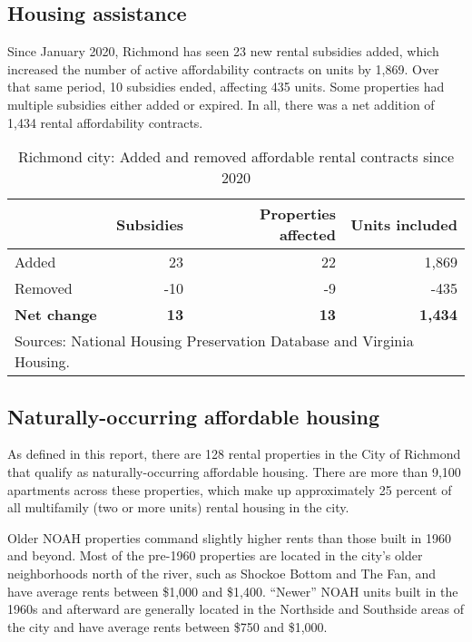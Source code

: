 \documentclass[
  letterpaper,
  DIV=11,
  numbers=noendperiod]{scrreprt}
\begin{document}
\hypertarget{housing-assistance}{%
\subsection{Housing assistance}\label{housing-assistance}}

Since January 2020, Richmond has seen 23 new rental subsidies added,
which increased the number of active affordability contracts on units by
1,869. Over that same period, 10 subsidies ended, affecting 435 units.
Some properties had multiple subsidies either added or expired. In all,
there was a net addition of 1,434 rental affordability contracts.

\hypertarget{tbl-nhpd}{}
\begin{table}
\caption{\label{tbl-nhpd}Richmond city: Added and removed affordable rental contracts since 2020 }\tabularnewline

\centering
\begin{tabular}{l|r|r|r}
\hline
 & Subsidies & Properties affected & Units included\\
\hline
Added & 23 & 22 & 1,869\\
\hline
Removed & -10 & -9 & -435\\
\hline
\textbf{Net change} & \textbf{13} & \textbf{13} & \textbf{1,434}\\
\hline
\multicolumn{4}{l}{\rule{0pt}{1em}Sources: National Housing Preservation Database and Virginia Housing.}\\
\end{tabular}
\end{table}

\hypertarget{naturally-occurring-affordable-housing-1}{%
\subsection{Naturally-occurring affordable
housing}\label{naturally-occurring-affordable-housing-1}}

As defined in this report, there are 128 rental properties in the City
of Richmond that qualify as naturally-occurring affordable housing.
There are more than 9,100 apartments across these properties, which make
up approximately 25 percent of all multifamily (two or more units)
rental housing in the city.

Older NOAH properties command slightly higher rents than those built in
1960 and beyond. Most of the pre-1960 properties are located in the
city's older neighborhoods north of the river, such as Shockoe Bottom
and The Fan, and have average rents between \$1,000 and \$1,400.
``Newer'' NOAH units built in the 1960s and afterward are generally
located in the Northside and Southside areas of the city and have
average rents between \$750 and \$1,000.
\end{document}
